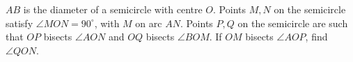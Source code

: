 $AB$ is the diameter of a semicircle with centre $O$. Points $M,N$ on the semicircle satisfy $\angle MON=90^\circ$, with $M$ on arc $AN$. Points $P,Q$ on the semicircle are such that $OP$ bisects $\angle AON$ and $OQ$ bisects $\angle BOM$. If $OM$ bisects $\angle AOP$, find $\angle QON$.
